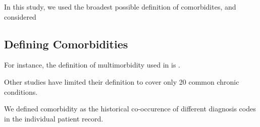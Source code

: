 In this study, we used the broadest possible definition of comorbidites,
and considered 

\subsection{Defining Comorbidities}

For instance, the definition of multimorbidity used in 
\textcite{formanMultimorbidity2018} is 
.

Other studies have limited their definition 
to cover only 20 common chronic conditions.
\autocite{roccaPrevalence2014}

We defined comorbidity as the historical co-occurence
of different diagnosis codes in the individual patient record.


